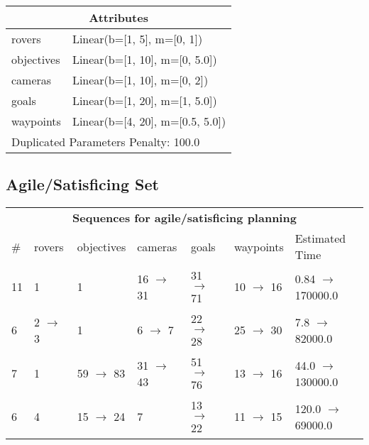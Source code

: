 \documentclass{article}
\begin{document}
                    \begin{center}
                    \begin{tabular}{p{}p{}}
                    \multicolumn{2}{c}{\bf \large Attributes}\\\midrule
                    rovers & Linear(b=[1, 5], m=[0, 1])\\
objectives & Linear(b=[1, 10], m=[0, 5.0])\\
cameras & Linear(b=[1, 10], m=[0, 2])\\
goals & Linear(b=[1, 20], m=[1, 5.0])\\
waypoints & Linear(b=[4, 20], m=[0.5, 5.0])
                    
                     \\\midrule
                    \multicolumn{2}{l}{Duplicated Parameters Penalty: 100.0}
                    \end{tabular}
                    \end{center}
                
                         \subsection*{Agile/Satisficing Set}

                        \begin{center}
                        \begin{tabular}{l|l|l|l|l|l|l}
                        \multicolumn{7}{c}{\bf \large Sequences for agile/satisficing planning}\\
                        \# & rovers & objectives & cameras & goals & waypoints & Estimated Time\\\midrule
                        11&1&1&16 $\rightarrow$ 31&31 $\rightarrow$ 71&10 $\rightarrow$ 16&0.84 $\rightarrow$ 170000.0\\
6&2 $\rightarrow$ 3&1&6 $\rightarrow$ 7&22 $\rightarrow$ 28&25 $\rightarrow$ 30&7.8 $\rightarrow$ 82000.0\\
7&1&59 $\rightarrow$ 83&31 $\rightarrow$ 43&51 $\rightarrow$ 76&13 $\rightarrow$ 16&44.0 $\rightarrow$ 130000.0\\
6&4&15 $\rightarrow$ 24&7&13 $\rightarrow$ 22&11 $\rightarrow$ 15&120.0 $\rightarrow$ 69000.0
                        \end{tabular}
                        \end{center}
                    
\end{document}
